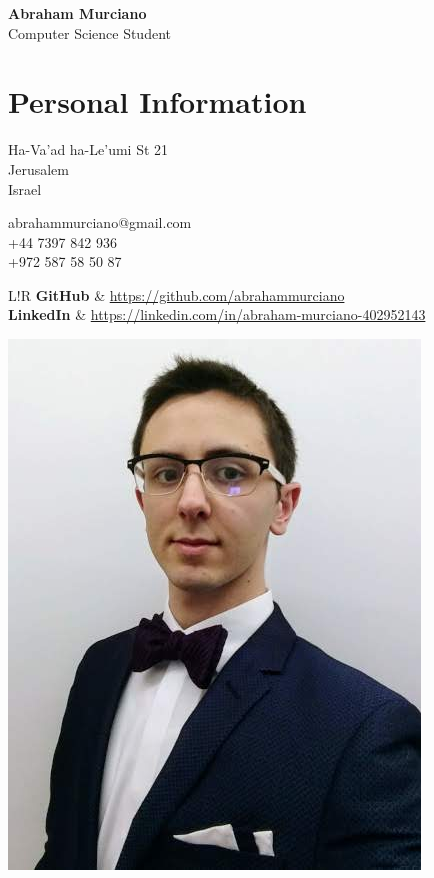 \documentclass{article}
\newcommand\VRule{\color{lightgray}\vrule width 0.4pt}
\begin{document}
\hspace{-18.4pt}
\begin{minipage}{0.8\textwidth}
	{\bfseries\Huge Abraham Murciano}\vspace{4pt}\\
	{\large Computer Science Student}

	\section*{Personal Information}
	\begin{multicols}{2}
		Ha-Va'ad ha-Le'umi St 21\\
		Jerusalem\\
		Israel
		\columnbreak

		abrahammurciano@gmail.com\\
		+44 7397 842 936\\
		+972 587 58 50 87
		\columnbreak
	\end{multicols}
	\begin{tabular}{L!{\VRule}R}
		\textbf{GitHub}   & \url{https://github.com/abrahammurciano} \\
		\textbf{LinkedIn} & \url{https://linkedin.com/in/abraham-murciano-402952143}
	\end{tabular}
\end{minipage}
%
\begin{minipage}{0.2\textwidth}
	\begin{flushright}
		\includegraphics{profile.jpg}
	\end{flushright}
\end{minipage}
\end{document}
